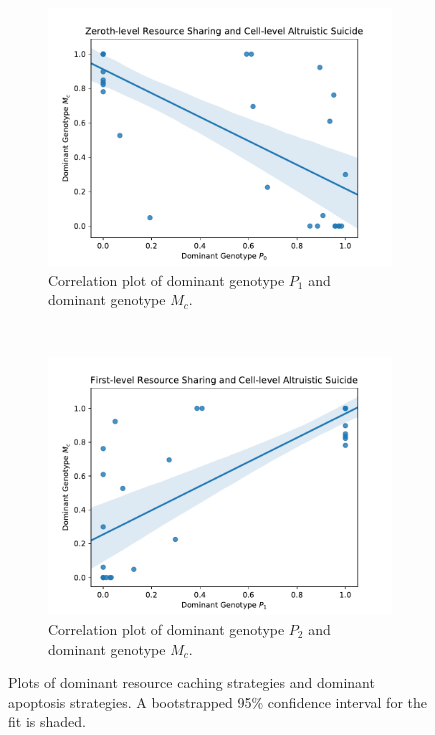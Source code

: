\begin{figure}[!htb]
\begin{center}

\begin{subfigure}[b]{0.45\columnwidth}
  \includegraphics[width=\columnwidth]{img/champion_res_pool1_vs_champion_damage_suicide0}
  \caption{
  Correlation plot of dominant genotype $P_1$ and dominant genotype $M_{c}$.
  }
  \label{fig:champion_res_pool1_vs_champion_damage_suicide0}
\end{subfigure}%
~~
\begin{subfigure}[b]{0.45\columnwidth}
  \includegraphics[width=\columnwidth]{img/champion_res_pool2_vs_champion_damage_suicide0}
  \caption{
  Correlation plot of dominant genotype $P_2$ and dominant genotype $M_{c}$.
  }
  \label{fig:champion_res_pool2_vs_champion_damage_suicide0}
\end{subfigure}

\caption{
Plots of dominant resource caching strategies and dominant apoptosis strategies.
A bootstrapped 95\% confidence interval for the fit is shaded.
}
\label{fig:damage_suicide}
\end{center}
\end{figure}
